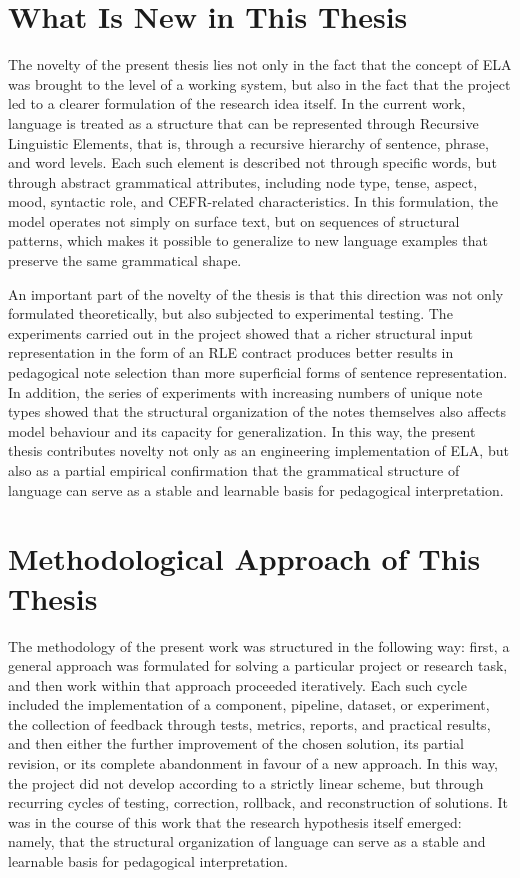 \documentclass[12pt,a4paper,oneside]{report}
\begin{document}
\section{What Is New in This Thesis}
The novelty of the present thesis lies not only in the fact that the concept of ELA was brought to the level of a working system, but also in the fact that the project led to a clearer formulation of the research idea itself. In the current work, language is treated as a structure that can be represented through Recursive Linguistic Elements, that is, through a recursive hierarchy of sentence, phrase, and word levels. Each such element is described not through specific words, but through abstract grammatical attributes, including node type, tense, aspect, mood, syntactic role, and CEFR-related characteristics. In this formulation, the model operates not simply on surface text, but on sequences of structural patterns, which makes it possible to generalize to new language examples that preserve the same grammatical shape.

An important part of the novelty of the thesis is that this direction was not only formulated theoretically, but also subjected to experimental testing. The experiments carried out in the project showed that a richer structural input representation in the form of an RLE contract produces better results in pedagogical note selection than more superficial forms of sentence representation. In addition, the series of experiments with increasing numbers of unique note types showed that the structural organization of the notes themselves also affects model behaviour and its capacity for generalization. In this way, the present thesis contributes novelty not only as an engineering implementation of ELA, but also as a partial empirical confirmation that the grammatical structure of language can serve as a stable and learnable basis for pedagogical interpretation.

\section{Methodological Approach of This Thesis}
The methodology of the present work was structured in the following way: first, a general approach was formulated for solving a particular project or research task, and then work within that approach proceeded iteratively. Each such cycle included the implementation of a component, pipeline, dataset, or experiment, the collection of feedback through tests, metrics, reports, and practical results, and then either the further improvement of the chosen solution, its partial revision, or its complete abandonment in favour of a new approach. In this way, the project did not develop according to a strictly linear scheme, but through recurring cycles of testing, correction, rollback, and reconstruction of solutions. It was in the course of this work that the research hypothesis itself emerged: namely, that the structural organization of language can serve as a stable and learnable basis for pedagogical interpretation.
\end{document}
